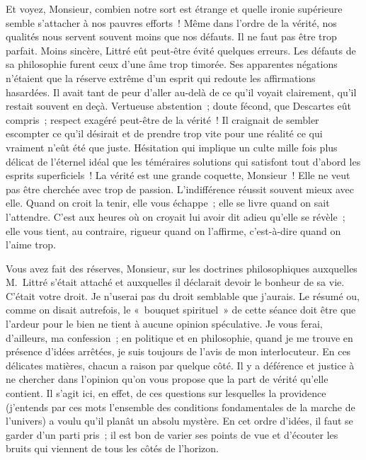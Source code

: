 \documentclass[french,twoside]{book} %
\newcommand\persName[1]{#1}
\begin{document}
Et voyez, Monsieur, combien notre sort est étrange et quelle ironie supérieure semble s’attacher à nos pauvres efforts ! Même dans l’ordre de la vérité, nos qualités nous servent souvent moins que nos défauts. Il ne faut pas être trop parfait. Moins sincère, {\persName Littré} eût peut-être évité quelques erreurs. Les défauts de sa philosophie furent ceux d’une âme trop timorée. Ses apparentes négations n’étaient que la réserve extrême d’un esprit qui redoute les affirmations hasardées. Il avait tant de peur d’aller au-delà de ce qu’il voyait clairement, qu’il restait souvent en deçà. Vertueuse abstention ; doute fécond, que {\persName Descartes} eût compris ; respect exagéré peut-être de la vérité ! Il craignait de sembler escompter ce qu’il désirait et de prendre trop vite pour une réalité ce qui vraiment n’eût été que juste. Hésitation qui implique un culte mille fois plus délicat de l’éternel idéal que les téméraires solutions qui satisfont tout d’abord les esprits superficiels ! La vérité est une grande coquette, Monsieur ! Elle ne veut pas être cherchée avec trop de passion. L’indifférence réussit souvent mieux avec elle. Quand on croit la tenir, elle vous échappe ; elle se livre quand on sait l’attendre. C’est aux heures où on croyait lui avoir dit adieu qu’elle se révèle ; elle vous tient, au contraire, rigueur quand on l’affirme, c’est-à-dire quand on l’aime trop.\par
Vous avez fait des réserves, Monsieur, sur les doctrines philosophiques auxquelles {\persName M. Littré} s’était attaché et auxquelles il déclarait devoir le bonheur de sa vie. C’était votre droit. Je n’userai pas du droit semblable que j’aurais. Le résumé ou, comme on disait autrefois, le « bouquet spirituel » de cette séance doit être que l’ardeur pour le bien ne tient à aucune opinion spéculative. Je vous ferai, d’ailleurs, ma confession ; en politique et en philosophie, quand je me trouve en présence d’idées arrêtées, je suis toujours de l’avis de mon interlocuteur. En ces délicates matières, chacun a raison par quelque côté. Il y a déférence et justice à ne chercher dans l’opinion qu’on vous propose que la part de vérité qu’elle contient. Il s’agit ici, en effet, de ces questions sur lesquelles la providence (j’entends par ces mots l’ensemble des conditions fondamentales de la marche de l’univers) a voulu qu’il planât un absolu mystère. En cet ordre d’idées, il faut se garder d’un parti pris ; il est bon de varier ses points de vue et d’écouter les bruits qui viennent de tous les côtés de l’horizon.\par
\end{document}
